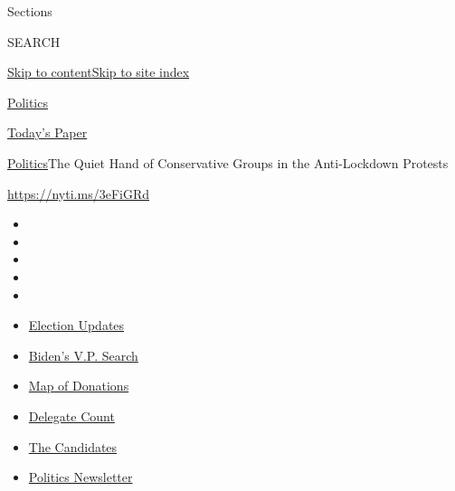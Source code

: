 Sections

SEARCH

\protect\hyperlink{site-content}{Skip to
content}\protect\hyperlink{site-index}{Skip to site index}

\href{https://www.nytimes3xbfgragh.onion/section/politics}{Politics}

\href{https://myaccount.nytimes3xbfgragh.onion/auth/login?response_type=cookie\&client_id=vi}{}

\href{https://www.nytimes3xbfgragh.onion/section/todayspaper}{Today's
Paper}

\href{/section/politics}{Politics}\textbar{}The Quiet Hand of
Conservative Groups in the Anti-Lockdown Protests

\url{https://nyti.ms/3eFiGRd}

\begin{itemize}
\item
\item
\item
\item
\item
\end{itemize}

\begin{itemize}
\item
  \href{https://www.nytimes3xbfgragh.onion/2020/07/31/us/elections/biden-vs-trump.html?action=click\&pgtype=Article\&state=default\&region=TOP_BANNER\&context=storylines_menu}{Election
  Updates}
\item
  \href{https://www.nytimes3xbfgragh.onion/article/biden-vice-president-2020.html?action=click\&pgtype=Article\&state=default\&region=TOP_BANNER\&context=storylines_menu}{Biden's
  V.P. Search}
\item
  \href{https://www.nytimes3xbfgragh.onion/interactive/2020/07/24/us/politics/trump-biden-campaign-donors.html?action=click\&pgtype=Article\&state=default\&region=TOP_BANNER\&context=storylines_menu}{Map
  of Donations}
\item
  \href{https://www.nytimes3xbfgragh.onion/interactive/2020/us/elections/delegate-count-primary-results.html?action=click\&pgtype=Article\&state=default\&region=TOP_BANNER\&context=storylines_menu}{Delegate
  Count}
\item
  \href{https://www.nytimes3xbfgragh.onion/interactive/2019/us/politics/2020-presidential-candidates.html?action=click\&pgtype=Article\&state=default\&region=TOP_BANNER\&context=storylines_menu}{The
  Candidates}
\item
  \href{https://www.nytimes3xbfgragh.onion/newsletters/politics?action=click\&pgtype=Article\&state=default\&region=TOP_BANNER\&context=storylines_menu}{Politics
  Newsletter}
\end{itemize}

